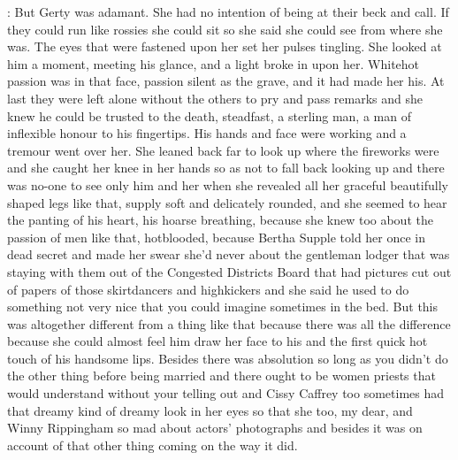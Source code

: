 :
But Gerty was adamant. She had no intention of being at their beck and
call. If they could run like rossies she could sit so she said she could
see from where she was. The eyes that were fastened upon her set
her pulses tingling. She looked at him a moment, meeting his glance,
and a light broke in upon her. Whitehot passion was in that face, passion
silent as the grave, and it had made her his. At last they were left
alone without the others to pry and pass remarks and she knew he
could be trusted to the death, steadfast, a sterling man, a man of
inflexible honour to his fingertips. His hands and face were working
and a tremour went over her. She leaned back far to look up where
the fireworks were and she caught her knee in her hands so as not
to fall back looking up and there was no-one to see only him and
her when she revealed all her graceful beautifully shaped legs like that,
supply soft and delicately rounded, and she seemed to hear the panting
of his heart, his hoarse breathing, because she knew too about the passion
of men like that, hotblooded, because Bertha Supple told her once in dead
secret and made her swear she'd never about the gentleman lodger that was
staying with them out of the Congested Districts Board that had pictures
cut out of papers of those skirtdancers and highkickers and she said he
used to do something not very nice that you could imagine sometimes in
the bed. But this was altogether different from a thing like that
because there was all the difference because she could almost feel
him draw her face to his and the first quick hot touch of his
handsome lips. Besides there was absolution so long as you didn't
do the other thing before being married and there ought to be
women priests that would understand without your telling out and
Cissy Caffrey too sometimes had that dreamy kind of dreamy look
in her eyes so that she too, my dear, and Winny Rippingham so mad
about actors' photographs and besides it was on account of that other
thing coming on the way it did.

